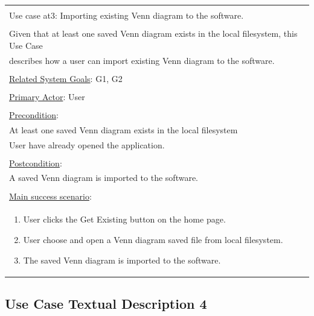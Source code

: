 \documentclass[fontsize=12pt,paper=letter,twoside]{scrartcl}
\begin{document}
\begin{table}[h]
	\begin{tabular}{|l|}
		\hline
		\\
		Use case at3: Importing existing Venn diagram to the software.							\\
		\\
		Given that at least one saved Venn diagram exists in the local filesystem, this Use Case		\\
		describes how a user can import existing Venn diagram to the software.					\\
		\\
		\underline{Related System Goals}: G1, G2											\\
		\\
		\underline{Primary Actor}: User														\\
		\\
		\underline{Precondition}:															\\ \qquad
		At least one saved Venn diagram exists in the local filesystem							\\ \qquad
		User have already opened the application.											\\
		\\
		\underline{Postcondition}:															\\ \qquad
		A saved Venn diagram is imported to the software.									\\
		\\
		\underline{Main success scenario}:													\\
		\begin{minipage}{6in}
			\vskip 4pt
			\begin{enumerate}
				\item User clicks the Get Existing button on the home page. 
				\item User choose and open a Venn diagram saved file from local filesystem.
				\item The saved Venn diagram is imported to the software.	
			\end{enumerate}
			\vskip 4pt
		\end{minipage}
		\\
		\hline
	\end{tabular}
\end{table}

\newpage

\subsection*{Use Case Textual Description 4}
\end{document}
